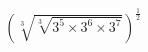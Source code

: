 \documentclass[preview]{standalone}
\begin{document}
\begin{align*}
\left( \sqrt[3]{\sqrt[3]{3^5 \times 3^6 \times 3^7}} \right)^\frac{1}{2}
\end{align*}
\end{document}
